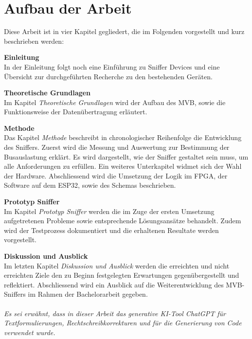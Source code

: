 
\section{Aufbau der Arbeit}
\label{Aufbau der Arbeit} %
Diese Arbeit ist in vier Kapitel gegliedert, die im Folgenden vorgestellt und kurz beschrieben werden:

\textbf{Einleitung}\\
In der Einleitung folgt noch eine Einführung zu Sniffer Devices und eine Übersicht zur durchgeführten Recherche zu den bestehenden Geräten.

\textbf{Theoretische Grundlagen}\\
Im Kapitel \textit{Theoretische Grundlagen} wird der Aufbau des MVB, sowie die Funktionsweise der Datenübertragung erläutert.

\textbf{Methode}\\
Das Kapitel \textit{Methode} beschreibt in chronologischer Reihenfolge die Entwicklung des Sniffers. Zuerst wird die Messung und Auswertung zur Bestimmung der Busauslastung erklärt. Es wird dargestellt, wie der Sniffer gestaltet sein muss, um alle Anforderungen zu erfüllen. Ein weiteres Unterkapitel widmet sich der Wahl der Hardware. Abschliessend wird die Umsetzung der Logik im FPGA, der Software auf dem ESP32, sowie des Schemas beschrieben.

\textbf{Prototyp Sniffer}\\
Im Kapitel \textit{Prototyp Sniffer} werden die im Zuge der ersten Umsetzung aufgetretenen Probleme sowie entsprechende Lösungsansätze behandelt. Zudem wird der Testprozess dokumentiert und die erhaltenen Resultate werden vorgestellt.

\textbf{Diskussion und Ausblick}\\
Im letzten Kapitel \textit{Diskussion und Ausblick} werden die erreichten und nicht erreichten Ziele den zu Beginn festgelegten Erwartungen gegenübergestellt und reflektiert. Abschliessend wird ein Ausblick auf die Weiterentwicklung des MVB-Sniffers im Rahmen der Bachelorarbeit gegeben.\\
\\
\textit{Es sei erwähnt, dass in dieser Arbeit das generative KI-Tool ChatGPT für Textformulierungen, Rechtschreibkorrekturen und für die Generierung von Code verwendet wurde.}